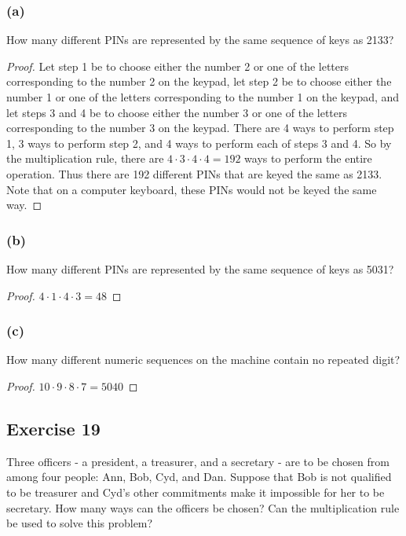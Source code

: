 \documentclass[14pt]{extarticle}
\begin{document}
\subsubsection{(a)}
How many different PINs are represented by the same sequence of keys as 2133?

\begin{proof}
Let step 1 be to choose either the number 2 or one of the letters corresponding to the number 2 on the keypad, let 
step 2 be to choose either the number 1 or one of the letters corresponding to the number 1 on the keypad, and 
let steps 3 and 4 be to choose either the number 3 or one of the letters corresponding to the number 3 on the keypad. 
There are 4 ways to perform step 1, 3 ways to perform step 2, and 4 ways to perform each of steps 3 and 4. So by the 
multiplication rule, there are \(4 \cdot 3 \cdot 4 \cdot 4 = 192\) ways to perform the entire operation. Thus there 
are 192 different PINs that are keyed the same as 2133. Note that on a computer keyboard, these PINs would not be 
keyed the same way.
\end{proof}

\subsubsection{(b)}
How many different PINs are represented by the same sequence of keys as 5031?

\begin{proof}
\(4 \cdot 1 \cdot 4 \cdot 3 = 48\)
\end{proof}

\subsubsection{(c)}
How many different numeric sequences on the machine contain no repeated digit?

\begin{proof}
\(10 \cdot 9 \cdot 8 \cdot 7 = 5040\)
\end{proof}

\subsection{Exercise 19}
Three officers - a president, a treasurer, and a secretary - are to be chosen from among four people: Ann, Bob, Cyd, 
and Dan. Suppose that Bob is not qualified to be treasurer and Cyd’s other commitments make it impossible for her to 
be secretary. How many ways can the officers be chosen? Can the multiplication rule be used to solve this problem?
\end{document}
